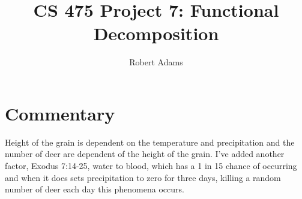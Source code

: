 \documentclass[letterpaper,10pt]{article} %
\begin{document}
\title{CS 475 Project 7: Functional Decomposition} 
\author{Robert Adams}
\maketitle



\section{Commentary}

	Height of the grain is dependent on the temperature and precipitation and the number of deer are dependent of the height of the grain.  I’ve added another factor, Exodus 7:14-25, water to blood, which has a 1 in 15 chance of occurring and when it does sets precipitation to zero for three days, killing a random number of deer each day this phenomena occurs. 

\begin{figure} [h]
	\centering
	
	\label{runtimes}
\end{figure}

\begin{figure} [h]
	\centering
	
	\label{runtimes}
\end{figure}
\end{document}
